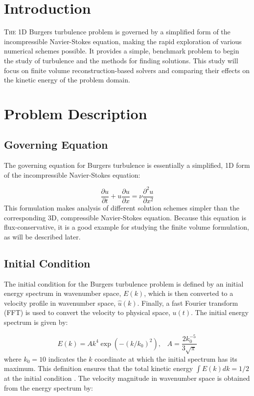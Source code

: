 \documentclass[conf]{new-aiaa}
\begin{document}
\section{Introduction}

\lettrine{T}{he} 1D Burgers turbulence problem is governed by a simplified form
of the incompressible Navier-Stokes equation, making the rapid exploration of
various numerical schemes possible. It provides a simple, benchmark problem to
begin the study of turbulence and the methods for finding solutions. This study
will focus on finite volume reconstruction-based solvers and comparing their
effects on the kinetic energy of the problem domain.


\section{Problem Description} \label{sec:problem}

\subsection{Governing Equation} \label{sec:gov_eqn}

The governing equation for Burgers turbulence is essentially a simplified, 1D
form of the incompressible Navier-Stokes equation:

\begin{equation} \label{eq:gov_eqn}
	\frac{\partial u}{\partial t} + u \frac{\partial u}{\partial x} =
	\nu \frac{\partial^2 u}{\partial x^2}
\end{equation}
This formulation makes analysis of different solution schemes simpler than the
corresponding 3D, compressible Navier-Stokes equation. Because this equation is
flux-conservative, it is a good example for studying the finite volume
formulation, as will be described later.

\subsection{Initial Condition}

The initial condition for the Burgers turbulence problem is defined by an
initial energy spectrum in wavenumber space, $E(k)$, which is then converted to
a velocity profile in wavenumber space, $\hat{u}(k)$. Finally, a fast Fourier
transform (FFT) is used to convert the velocity to physical space, $u(t)$. The
initial energy spectrum is given by:

\begin{equation}
	E(k) = Ak^4 \exp(-(k/k_0)^2) \textit{,} \quad
	A = \frac{2k_0^{-5}}{3\sqrt{\pi}}
\end{equation}
where $k_0=10$ indicates the $k$ coordinate at which the initial spectrum has
its maximum. This definition ensures that the total kinetic energy $\int E(k)dk
= 1/2$ at the initial condition \cite{maulik2018explicit}. The velocity
magnitude in wavenumber space is obtained from the energy spectrum by:
\end{document}
